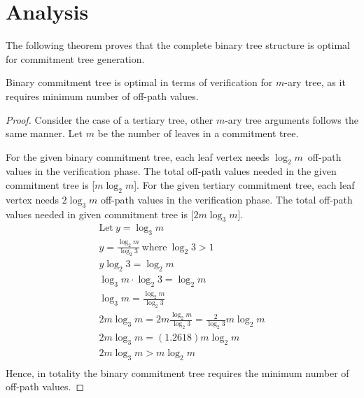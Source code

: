\chapter{Analysis}

	
	The following theorem proves that the complete binary tree structure is optimal for commitment tree generation.
	\begin{theorem}
		\label{the:ct}
		Binary commitment tree is optimal in terms of verification for $m$-ary tree, as it requires minimum number of off-path values.
	\end{theorem}

	\begin{proof}
		Consider the case of a tertiary tree, other $m$-ary tree arguments follows the same manner.
		Let $m$ be the number of leaves in a commitment tree.
		
		For the given binary commitment tree, each leaf vertex needs $\log_2 m$\ off-path values in the verification phase.
		The total off-path values needed in the given commitment tree is [${m \log_2 m}$].
		For the given tertiary commitment tree, each leaf vertex needs $2 \log_3 m$ off-path values in the verification phase.
		The total off-path values needed in given commitment tree is [$2 m \log_3 m$].
			\begin{equation*}
				\begin{array}{l}
					\mbox{Let}\  y = \log_3 m\\
					y = \frac{ {\log _2 m } }{{\log _2  3 }}\ \mbox{where}\ \log_2 3 > 1\\
					y \log_2 3 = \log _2 m \\
					\log_3 m \cdot \log_2 3 = \log _2 m \\
					\log_3 m = \frac{ {\log _2 m } }{{\log _2  3 }} \\
					2m\log_3 m = 2m\frac{ {\log _2 m } }{{\log _2  3 }} = \frac{ {2 } } {{\log _2  3 }}m\log _2 m \\
					2m\log_3 m = (1.2618)m\log _2 m \\
					2m\log_3 m > m\log _2 m \\

				\end{array}
			\end{equation*}
		Hence, in totality the binary commitment tree requires the minimum number of off-path values.
	\end{proof}

